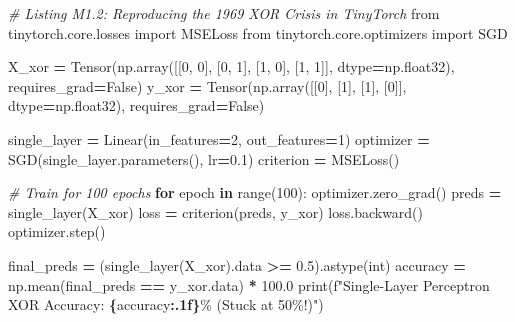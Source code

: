 \documentclass[
  letterpaper,
]{scrbook}
\newenvironment{Shaded}{\begin{snugshade}}{\end{snugshade}}
\newcommand{\BuiltInTok}[1]{#1}
\newcommand{\CommentTok}[1]{\textcolor[rgb]{0.56,0.35,0.01}{\textit{#1}}}
\newcommand{\ControlFlowTok}[1]{\textcolor[rgb]{0.13,0.29,0.53}{\textbf{#1}}}
\newcommand{\DecValTok}[1]{\textcolor[rgb]{0.00,0.00,0.81}{#1}}
\newcommand{\FloatTok}[1]{\textcolor[rgb]{0.00,0.00,0.81}{#1}}
\newcommand{\ImportTok}[1]{#1}
\newcommand{\KeywordTok}[1]{\textcolor[rgb]{0.13,0.29,0.53}{\textbf{#1}}}
\newcommand{\NormalTok}[1]{#1}
\newcommand{\OperatorTok}[1]{\textcolor[rgb]{0.81,0.36,0.00}{\textbf{#1}}}
\newcommand{\SpecialCharTok}[1]{\textcolor[rgb]{0.81,0.36,0.00}{\textbf{#1}}}
\newcommand{\SpecialStringTok}[1]{\textcolor[rgb]{0.31,0.60,0.02}{#1}}
\newcommand{\VariableTok}[1]{\textcolor[rgb]{0.00,0.00,0.00}{#1}}
\begin{document}
\begin{Shaded}
\begin{Highlighting}[]
\CommentTok{\# Listing M1.2: Reproducing the 1969 XOR Crisis in TinyTorch}
\ImportTok{from}\NormalTok{ tinytorch.core.losses }\ImportTok{import}\NormalTok{ MSELoss}
\ImportTok{from}\NormalTok{ tinytorch.core.optimizers }\ImportTok{import}\NormalTok{ SGD}

\NormalTok{X\_xor }\OperatorTok{=}\NormalTok{ Tensor(np.array([[}\DecValTok{0}\NormalTok{, }\DecValTok{0}\NormalTok{], [}\DecValTok{0}\NormalTok{, }\DecValTok{1}\NormalTok{], [}\DecValTok{1}\NormalTok{, }\DecValTok{0}\NormalTok{], [}\DecValTok{1}\NormalTok{, }\DecValTok{1}\NormalTok{]], dtype}\OperatorTok{=}\NormalTok{np.float32), requires\_grad}\OperatorTok{=}\VariableTok{False}\NormalTok{)}
\NormalTok{y\_xor }\OperatorTok{=}\NormalTok{ Tensor(np.array([[}\DecValTok{0}\NormalTok{], [}\DecValTok{1}\NormalTok{], [}\DecValTok{1}\NormalTok{], [}\DecValTok{0}\NormalTok{]], dtype}\OperatorTok{=}\NormalTok{np.float32), requires\_grad}\OperatorTok{=}\VariableTok{False}\NormalTok{)}

\NormalTok{single\_layer }\OperatorTok{=}\NormalTok{ Linear(in\_features}\OperatorTok{=}\DecValTok{2}\NormalTok{, out\_features}\OperatorTok{=}\DecValTok{1}\NormalTok{)}
\NormalTok{optimizer }\OperatorTok{=}\NormalTok{ SGD(single\_layer.parameters(), lr}\OperatorTok{=}\FloatTok{0.1}\NormalTok{)}
\NormalTok{criterion }\OperatorTok{=}\NormalTok{ MSELoss()}

\CommentTok{\# Train for 100 epochs}
\ControlFlowTok{for}\NormalTok{ epoch }\KeywordTok{in} \BuiltInTok{range}\NormalTok{(}\DecValTok{100}\NormalTok{):}
\NormalTok{    optimizer.zero\_grad()}
\NormalTok{    preds }\OperatorTok{=}\NormalTok{ single\_layer(X\_xor)}
\NormalTok{    loss }\OperatorTok{=}\NormalTok{ criterion(preds, y\_xor)}
\NormalTok{    loss.backward()}
\NormalTok{    optimizer.step()}

\NormalTok{final\_preds }\OperatorTok{=}\NormalTok{ (single\_layer(X\_xor).data }\OperatorTok{\textgreater{}=} \FloatTok{0.5}\NormalTok{).astype(}\BuiltInTok{int}\NormalTok{)}
\NormalTok{accuracy }\OperatorTok{=}\NormalTok{ np.mean(final\_preds }\OperatorTok{==}\NormalTok{ y\_xor.data) }\OperatorTok{*} \FloatTok{100.0}
\BuiltInTok{print}\NormalTok{(}\SpecialStringTok{f"Single{-}Layer Perceptron XOR Accuracy: }\SpecialCharTok{\{}\NormalTok{accuracy}\SpecialCharTok{:.1f\}}\SpecialStringTok{\% (Stuck at 50\%!)"}\NormalTok{)}
\end{Highlighting}
\end{Shaded}
\end{document}
